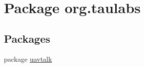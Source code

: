 \hypertarget{namespaceorg_1_1taulabs}{\section{Package org.\-taulabs}
\label{namespaceorg_1_1taulabs}
}
\subsection*{Packages}
\begin{DoxyCompactItemize}
\item 
package \hyperlink{namespaceorg_1_1taulabs_1_1uavtalk}{uavtalk}
\end{DoxyCompactItemize}
